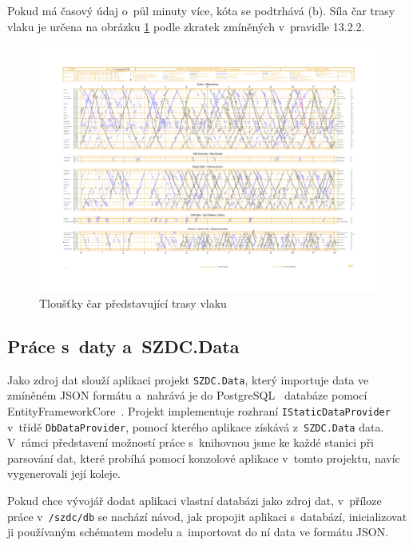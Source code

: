 Pokud má časový údaj o~půl minuty více, kóta se podtrhává (b). Síla čar trasy vlaku je určena na obrázku \ref{fig:kap6:tloustka_car_trasy_vlaku} podle zkratek zmíněných v~pravidle 13.2.2.

\begin{figure}[!hbt]
	\centering
	\includegraphics[width=\textwidth]{../img/kap6_tloustka_car_trasy_vlaku}
	\caption{Tloušťky čar představující trasy vlaku}
	\label{fig:kap6:tloustka_car_trasy_vlaku}
\end{figure}

\subsection*{Práce s~daty a~SZDC.Data}
Jako zdroj dat slouží aplikaci projekt \texttt{SZDC.Data}, který importuje data ve zmíněném JSON formátu a~nahrává je do PostgreSQL~\cite{PostgreSQL} databáze pomocí EntityFrameworkCore~\cite{EntityFrameworkCore}. Projekt implementuje rozhraní \texttt{IStaticDataProvider} v~třídě \texttt{DbDataProvider}, pomocí kterého aplikace získává z~\texttt{SZDC.Data} data. V~rámci představení možností práce s~knihovnou jsme ke každé stanici při parsování dat, které probíhá pomocí konzolové aplikace v~tomto projektu, navíc vygenerovali její koleje.

Pokud chce vývojář dodat aplikaci vlastní databázi jako zdroj dat, v~příloze práce v~\texttt{/szdc/db} se nachází návod, jak propojit aplikaci s~databází, inicializovat ji používaným schématem modelu a~importovat do ní data ve formátu JSON. 

\newpage
